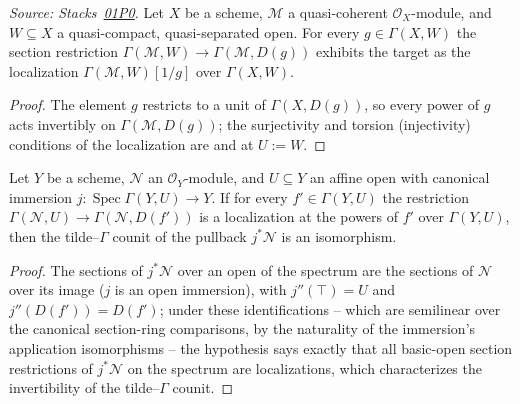 \begin{lemma}
  \label{lem:qcqs_section_localization}
  \leanok
  \textit{Source: Stacks~\href{https://stacks.math.columbia.edu/tag/01P0}{01P0}.}
  Let $X$ be a scheme, $\mathcal{M}$ a quasi-coherent $\mathcal{O}_X$-module,
  and $W \subseteq X$ a quasi-compact, quasi-separated open. For every
  $g \in \Gamma(X, W)$ the section restriction
  $\Gamma(\mathcal{M}, W) \to \Gamma(\mathcal{M}, D(g))$ exhibits the target
  as the localization $\Gamma(\mathcal{M}, W)[1/g]$ over $\Gamma(X, W)$.
\end{lemma}
\begin{proof}
  \leanok
  The element $g$ restricts to a unit of $\Gamma(X, D(g))$, so every power of
  $g$ acts invertibly on $\Gamma(\mathcal{M}, D(g))$; the surjectivity and
  torsion (injectivity) conditions of the localization are
   and
   at $U := W$.
\end{proof}

\begin{lemma}
  \label{lem:fromTildeGamma_pullback_fromSpec_converse}
  \leanok
  Let $Y$ be a scheme, $\mathcal{N}$ an $\mathcal{O}_Y$-module, and
  $U \subseteq Y$ an affine open with canonical immersion
  $j : \operatorname{Spec} \Gamma(Y, U) \to Y$. If for every
  $f' \in \Gamma(Y, U)$ the restriction
  $\Gamma(\mathcal{N}, U) \to \Gamma(\mathcal{N}, D(f'))$ is a localization at
  the powers of $f'$ over $\Gamma(Y, U)$, then the tilde--$\Gamma$ counit of
  the pullback $j^* \mathcal{N}$ is an isomorphism.
\end{lemma}
\begin{proof}
  \leanok
  The sections of $j^* \mathcal{N}$ over an open of the spectrum are the
  sections of $\mathcal{N}$ over its image ($j$ is an open immersion), with
  $j''(\top) = U$ and $j''(D(f')) = D(f')$; under these identifications --
  which are semilinear over the canonical section-ring comparisons, by the
  naturality of the immersion's application isomorphisms -- the hypothesis
  says exactly that all basic-open section restrictions of $j^* \mathcal{N}$
  on the spectrum are localizations, which characterizes the invertibility of
  the tilde--$\Gamma$ counit.
\end{proof}

